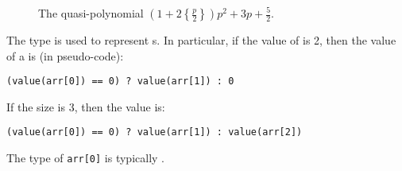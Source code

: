 \begin{example}
\begin{figure}
\caption{The quasi-polynomial 
$\left(1+2 \left\{\frac p 2\right\}\right) p^2 + 3 p + \frac 5 2$.}
\label{f:fractional}
\end{figure}

\end{example}

The  type is used to represent s.
In particular, if the value of  is 2, then
the value of a  is (in pseudo-code):
\begin{verbatim}
(value(arr[0]) == 0) ? value(arr[1]) : 0
\end{verbatim}
If the size is 3, then the value is:
\begin{verbatim}
(value(arr[0]) == 0) ? value(arr[1]) : value(arr[2])
\end{verbatim}
The type of \verb+arr[0]+ is typically .

